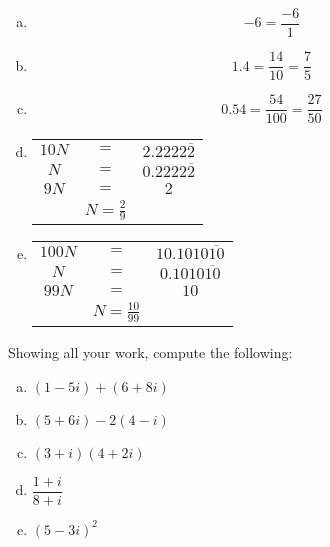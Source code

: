 \documentclass[11pt,letterpaper]{article}
\begin{document}
\sol
\begin{enumerate}[(a)]
\item 
	\[
	-6= \dfrac{-6}{1}
	\] \pspace

\item 
	\[
	1.4= \dfrac{14}{10}= \dfrac{7}{5}
	\] \pspace

\item 
	\[
	0.54= \dfrac{54}{100}= \dfrac{27}{50}
	\] \pspace

\item \phantom{.} \par
	\begin{table}[!ht]
	\centering\small
	\begin{tabular}{ccc}
	$10N$ & $=$ & $2.2222\overline{2}$ \\ 
	$N$ & $=$ & $0.2222\overline{2}$ \\ \hline
	$9N$ & $=$ & $2$ \\
	& $N= \frac{2}{9}$ & 
	\end{tabular}
	\end{table}

\item \phantom{.} \par
	\begin{table}[!ht]
	\centering\small
	\begin{tabular}{ccc}
	$100N$ & $=$ & $10.1010\overline{10}$ \\ 
	$N$ & $=$ & $0.1010\overline{10}$ \\ \hline
	$99N$ & $=$ & $10$ \\
	& $N= \frac{10}{99}$ & 
	\end{tabular}
	\end{table} 
\end{enumerate}



\newpage



 Showing all your work, compute the following:
\begin{enumerate}[(a)]
\item $(1 - 5i) + (6 + 8i)$
\item $(5 + 6i) - 2(4 - i)$
\item $(3 + i)(4 + 2i)$
\item $\dfrac{1 + i}{8 + i}$
\item $(5 - 3i)^2$
\end{enumerate} \pspace
\end{document}
